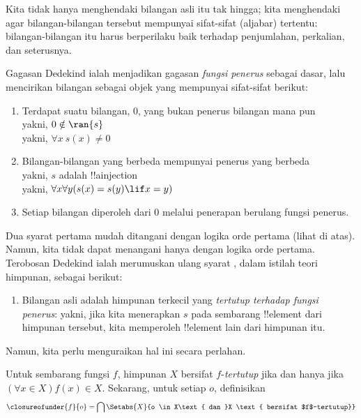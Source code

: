 \documentclass[../../../include/open-logic-section]{subfiles}
\begin{document}

Kita tidak hanya menghendaki bilangan asli itu tak hingga; kita menghendaki
agar bilangan-bilangan tersebut mempunyai sifat-sifat (aljabar) tertentu:
bilangan-bilangan itu harus berperilaku baik terhadap penjumlahan, perkalian,
dan seterusnya.

Gagasan Dedekind ialah menjadikan gagasan \emph{fungsi penerus} sebagai
dasar, lalu mencirikan bilangan sebagai objek yang mempunyai sifat-sifat
berikut:
\begin{enumerate}
	\item Terdapat suatu bilangan, $0$, yang bukan penerus bilangan mana pun
	\\yakni, $0 \notin \ran{s}$
	\\yakni, $\forall x\ s(x) \neq 0$
	\item Bilangan-bilangan yang berbeda mempunyai penerus yang berbeda
	\\yakni, $s$ adalah !!a{injection}
	\\yakni, $\forall x \forall y (s(x) = s(y) \lif x = y)$
	\item{} Setiap bilangan diperoleh dari
	$0$ melalui penerapan berulang fungsi penerus.
\end{enumerate}
Dua syarat pertama mudah ditangani dengan logika orde pertama (lihat di
atas). Namun, kita tidak dapat menangani  hanya
dengan logika orde pertama. Terobosan Dedekind ialah merumuskan ulang syarat
, dalam istilah teori himpunan, sebagai berikut:
\begin{enumerate}
	\item[3$'$.] Bilangan asli adalah himpunan terkecil yang
	\emph{tertutup terhadap fungsi penerus}: yakni, jika kita menerapkan
	$s$ pada sembarang !!{element} dari himpunan tersebut, kita memperoleh
	!!{element} lain dari himpunan itu.
\end{enumerate}
Namun, kita perlu menguraikan hal ini secara perlahan.

\begin{defn}
	Untuk sembarang fungsi $f$, himpunan $X$ bersifat $f$-\emph{tertutup}
	{jika dan hanya jika} $(\forall x \in X)f(x) \in X$. Sekarang, untuk setiap $o$,
	definisikan
	$$\closureofunder{f}{o} = \bigcap\Setabs{X}{o \in X\text{ dan }X
\text{ bersifat $f$-tertutup}}$$
\end{defn}
\end{document}
